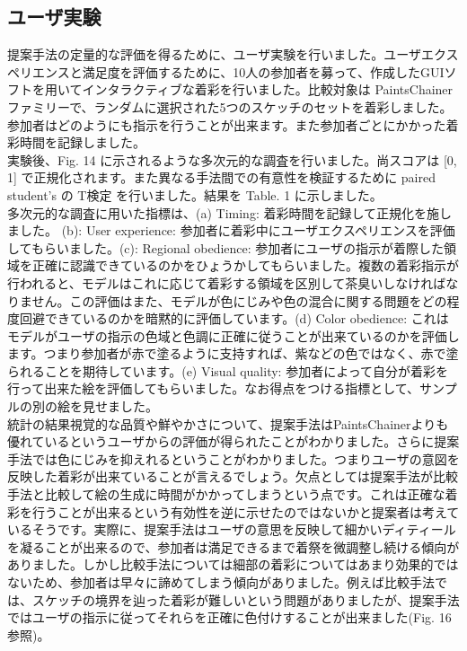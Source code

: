 \documentclass[a4paper, dvipdfmx, 10pt]{article}
\begin{document}
\subsection{ユーザ実験}
\label{sec:org8441dbf}
提案手法の定量的な評価を得るために、ユーザ実験を行いました。ユーザエクスペリエンスと満足度を評価するために、10人の参加者を募って、作成したGUIソフトを用いてインタラクティブな着彩を行いました。比較対象は PaintsChainer ファミリーで、ランダムに選択された5つのスケッチのセットを着彩しました。参加者はどのようにも指示を行うことが出来ます。また参加者ごとにかかった着彩時間を記録しました。\\

実験後、Fig. 14 に示されるような多次元的な調査を行いました。尚スコアは [0, 1] で正規化されます。また異なる手法間での有意性を検証するために paired student's の T検定 を行いました。結果を Table. 1 に示しました。\\

多次元的な調査に用いた指標は、(a) Timing: 着彩時間を記録して正規化を施しました。 (b): User experience: 参加者に着彩中にユーザエクスペリエンスを評価してもらいました。(c): Regional obedience: 参加者にユーザの指示が着際した領域を正確に認識できているのかをひょうかしてもらいました。複数の着彩指示が行われると、モデルはこれに応じて着彩する領域を区別して茶臭いしなければなりません。この評価はまた、モデルが色にじみや色の混合に関する問題をどの程度回避できているのかを暗黙的に評価しています。(d) Color obedience: これはモデルがユーザの指示の色域と色調に正確に従うことが出来ているのかを評価します。つまり参加者が赤で塗るように支持すれば、紫などの色ではなく、赤で塗られることを期待しています。(e) Visual quality: 参加者によって自分が着彩を行って出来た絵を評価してもらいました。なお得点をつける指標として、サンプルの別の絵を見せました。\\

統計の結果視覚的な品質や鮮やかさについて、提案手法はPaintsChainerよりも優れているというユーザからの評価が得られたことがわかりました。さらに提案手法では色にじみを抑えれるということがわかりました。つまりユーザの意図を反映した着彩が出来ていることが言えるでしょう。欠点としては提案手法が比較手法と比較して絵の生成に時間がかかってしまうという点です。これは正確な着彩を行うことが出来るという有効性を逆に示せたのではないかと提案者は考えているそうです。実際に、提案手法はユーザの意思を反映して細かいディティールを凝ることが出来るので、参加者は満足できるまで着祭を微調整し続ける傾向がありました。しかし比較手法については細部の着彩についてはあまり効果的ではないため、参加者は早々に諦めてしまう傾向がありました。例えば比較手法では、スケッチの境界を辿った着彩が難しいという問題がありましたが、提案手法ではユーザの指示に従ってそれらを正確に色付けすることが出来ました(Fig. 16 参照)。\\
\end{document}
